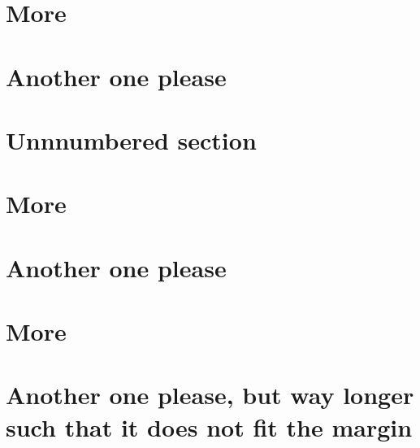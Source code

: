 \section{More}
\section{Another one please}
\section*{Unnnumbered section}
\section{More}
\section{Another one please}
\section{More}
\section{Another one please, but way longer such that it does not fit the margin}